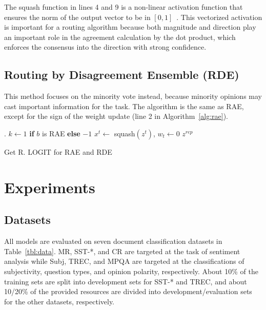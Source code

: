 \documentclass{article}
\begin{document}
The squash function in lines 4 and 9 is a non-linear activation function that ensures the norm of the output vector to be in $[0,1]$~\cite{sabour2017dynamic}.
This vectorized activation is important for a routing algorithm because both magnitude and direction play an important role in the agreement calculation by the dot product, which enforces the consensus into the direction with strong confidence.



\subsection{\fontsize{10.5pt}{12.6pt}\selectfont Routing by Disagreement Ensemble (RDE)}
\label{sssec:rde-ensemble}

This method focuses on the minority vote instead, because minority opinions may cast important information for the task.
The algorithm is the same as RAE, except for the sign of the weight update (line 2 in Algorithm~\ref{alg:rae}).

\begin{algorithm}[hbtp!]{
	\small
	\SetAlgoLined
    \SetAlgoVlined
    \DontPrintSemicolon
	.
$k\leftarrow1$ \textbf{if} {$b$ is RAE} \textbf{else} {$-1$}\;
	{
		$x^t \leftarrow $ squash$(z^t)$, 		$w_t \leftarrow 0$\;
	}
	\Return $z^{rep}$
	\caption{\small Get R. LOGIT for RAE and RDE}
	\label{alg:rae}
}
\end{algorithm}








 \section{Experiments}
\label{sec:experiment}
\subsection{Datasets}
All models are evaluated on seven document classification datasets in Table~\ref{tbl:data}.
MR, SST-*, and CR are targeted at the task of sentiment analysis while Subj, TREC, and MPQA are targeted at the classifications of subjectivity, question types, and opinion polarity, respectively.
About 10\% of the training sets are split into development sets for SST-* and TREC, and about 10/20\% of the provided resources are divided into development/evaluation sets for the other datasets, respectively.
\end{document}
